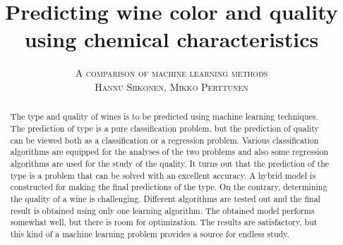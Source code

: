 \documentclass[twoside]{article}
\title{\vspace{-15mm}\fontsize{24pt}{10pt}\selectfont\textbf{Predicting wine color and quality using chemical characteristics}}
\author{
\large
\textsc{A comparison of machine learning methods}\\[2mm]
\textsc{Hannu Siikonen, Mikko Perttunen}\\[2mm]
\vspace{-5mm}
}
\date{}
\begin{document}
\maketitle %


\begin{abstract}
The type and quality of wines is to be predicted using machine learning techniques. The prediction
of type is a pure classification problem, but the prediction of quality can be viewed both as
a classification or a regression problem. Various classification algorithms are equipped
for the analyses of the two problems and also some regression algorithms are used for the study
of the quality. It turns out that the prediction of the type is a problem that can be solved
with an excellent accuracy. A hybrid model is constructed for making the final predictions
of the type. On the contrary, determining the quality of a wine is challenging. Different
algorithms are tested out and the final result is obtained using only one learning
algorithm. The obtained model performs somewhat well, but there is room for optimization. 
The results are satisfactory, but this kind of a machine learning problem provides a source
for endless study.

\end{abstract}

\end{document}
